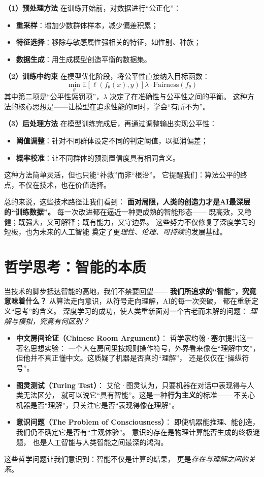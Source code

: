 \textbf{（1）预处理方法}  
在训练开始前，对数据进行“公正化”：  
\begin{itemize}
\item \textbf{重采样}：增加少数群体样本，减少偏差积累；  
\item \textbf{特征选择}：移除与敏感属性强相关的特征，如性别、种族；  
\item \textbf{数据生成}：用生成模型创造平衡的数据集。  
\end{itemize}

\textbf{（2）训练中约束}  
在模型优化阶段，将公平性直接纳入目标函数：  
$$\min_\theta \mathbb{E}[\ell(f_\theta(x), y)]  \lambda \cdot \text{Fairness}(f_\theta)$$  
其中第二项是“公平性惩罚项”，$\lambda$ 决定了在准确性与公平性之间的平衡。  
这种方法的核心思想是——让模型在追求性能的同时，学会“有所不为”。

\textbf{（3）后处理方法}  
在模型训练完成后，再通过调整输出实现公平性：  
\begin{itemize}
\item \textbf{阈值调整}：针对不同群体设定不同的判定阈值，以抵消偏差；  
\item \textbf{概率校准}：让不同群体的预测置信度具有相同含义。  
\end{itemize}
这种方法简单灵活，但也只能“补救”而非“根治”。  
它提醒我们：算法公平的终点，不仅在技术，也在价值选择。

总的来说，这些技术路径让我们看到：  
\textbf{面对局限，人类的创造力才是AI最深层的“训练数据”。}  
每一次改进都在逼近一种更成熟的智能形态——  
既高效，又稳健；既强大，又可解释；既有能力，又守边界。  
这些努力不仅修复了深度学习的短板，也为未来的人工智能  
奠定了更\textit{理性、伦理、可持续}的发展基础。

\section{哲学思考：智能的本质}

当技术的脚步抵达智能的高地，我们不禁要回望——  
\textbf{我们所追求的“智能”，究竟意味着什么？}  
从算法走向意识，从符号走向理解，AI的每一次突破，  
都在重新定义“思考”的含义。  
深度学习的成功，使人类重新面对一个古老而未解的问题：  
\textit{理解与模拟，究竟有何区别？}

\begin{itemize}
\item \textbf{中文房间论证（Chinese Room Argument）}：  
  哲学家约翰·塞尔提出这一著名思想实验：  
  一个人在房间里按规则操作符号，外界看来像在“理解中文”，  
  但他并不真正懂中文。这质疑了机器是否真的“理解”，  
  还是仅仅在“操纵符号”。  

\item \textbf{图灵测试（Turing Test）}：  
  艾伦·图灵认为，只要机器在对话中表现得与人类无法区分，  
  就可以说它“具有智能”。这是一种\textbf{行为主义}的标准——  
  不关心机器是否“理解”，只关注它是否“表现得像在理解”。  

\item \textbf{意识问题（The Problem of Consciousness）}：  
  即使机器能推理、能创造，我们仍不确定它是否有“主观体验”。  
  意识的存在是物理计算能否生成的终极谜题，  
  也是人工智能与人类智能之间最深的鸿沟。  
\end{itemize}
这些哲学问题让我们意识到：智能不仅是计算的结果，  
更是\textit{存在与理解之间的关系}。


